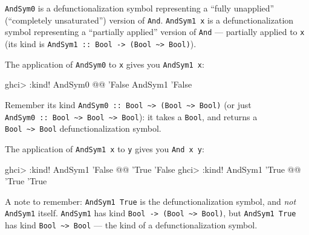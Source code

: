 \documentclass[]{article}
\newenvironment{Shaded}{}{}
\newcommand{\DataTypeTok}[1]{\textcolor[rgb]{0.56,0.13,0.00}{#1}}
\newcommand{\FunctionTok}[1]{\textcolor[rgb]{0.02,0.16,0.49}{#1}}
\newcommand{\NormalTok}[1]{#1}
\begin{document}
\texttt{AndSym0} is a defunctionalization symbol representing a ``fully
unapplied'' (``completely unsaturated'') version of \texttt{And}.
\texttt{AndSym1\ x} is a defunctionalization symbol representing a ``partially
applied'' version of \texttt{And} --- partially applied to \texttt{x} (its kind
is
\texttt{AndSym1\ ::\ Bool\ -\textgreater{}\ (Bool\ \textasciitilde{}\textgreater{}\ Bool)}).

The application of \texttt{AndSym0} to \texttt{x} gives you \texttt{AndSym1\ x}:

\begin{Shaded}
\begin{Highlighting}[]
\NormalTok{ghci}\FunctionTok{>} \FunctionTok{:}\NormalTok{kind}\FunctionTok{!} \DataTypeTok{AndSym0} \FunctionTok{@@}\NormalTok{ '}\DataTypeTok{False}
\DataTypeTok{AndSym1}\NormalTok{ '}\DataTypeTok{False}
\end{Highlighting}
\end{Shaded}

Remember its kind
\texttt{AndSym0\ ::\ Bool\ \textasciitilde{}\textgreater{}\ (Bool\ \textasciitilde{}\textgreater{}\ Bool)}
(or just
\texttt{AndSym0\ ::\ Bool\ \textasciitilde{}\textgreater{}\ Bool\ \textasciitilde{}\textgreater{}\ Bool}):
it takes a \texttt{Bool}, and returns a
\texttt{Bool\ \textasciitilde{}\textgreater{}\ Bool} defunctionalization symbol.

The application of \texttt{AndSym1\ x} to \texttt{y} gives you
\texttt{And\ x\ y}:

\begin{Shaded}
\begin{Highlighting}[]
\NormalTok{ghci}\FunctionTok{>} \FunctionTok{:}\NormalTok{kind}\FunctionTok{!} \DataTypeTok{AndSym1}\NormalTok{ '}\DataTypeTok{False} \FunctionTok{@@}\NormalTok{ '}\DataTypeTok{True}
\NormalTok{'}\DataTypeTok{False}
\NormalTok{ghci}\FunctionTok{>} \FunctionTok{:}\NormalTok{kind}\FunctionTok{!} \DataTypeTok{AndSym1}\NormalTok{ '}\DataTypeTok{True}  \FunctionTok{@@}\NormalTok{ '}\DataTypeTok{True}
\NormalTok{'}\DataTypeTok{True}
\end{Highlighting}
\end{Shaded}

A note to remember: \texttt{AndSym1\ \textquotesingle{}True} is the
defunctionalization symbol, and \emph{not} \texttt{AndSym1} itself.
\texttt{AndSym1} has kind
\texttt{Bool\ -\textgreater{}\ (Bool\ \textasciitilde{}\textgreater{}\ Bool)},
but \texttt{AndSym1\ \textquotesingle{}True} has kind
\texttt{Bool\ \textasciitilde{}\textgreater{}\ Bool} --- the kind of a
defunctionalization symbol.
\end{document}
